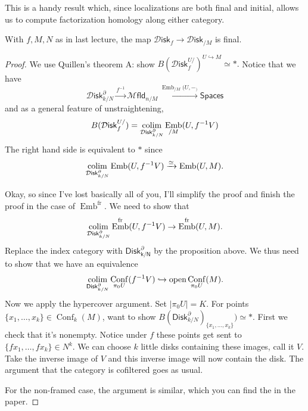 \documentclass{amsart}
\DeclareMathOperator{\Emb}{Emb}
\DeclareMathOperator{\Conf}{Conf}
\begin{document}
This is a handy result which, since localizations are both final and initial,
allows us to compute factorization homology along either category.
\begin{lemma}[AF 3.1]
    With $f,M,N$ as in last lecture, the map $\mathcal{D}\mathsf{isk}_f\to\mathcal{D}\mathsf{isk}_{/M}$ is final.
\end{lemma}
\begin{proof}
    We use Quillen's theorem A: show $B(\mathcal{D}\mathsf{isk}_f^{U/})^{U\hookrightarrow M}\simeq *.$
    Notice that we have
    \begin{equation*}
        \mathcal{D}\mathsf{isk}_{k/N}^\partial \xrightarrow{f^{-1}} \mathcal{M}\mathsf{fld}_{n/M} \xrightarrow{\Emb_{/M}(U,-_)} \mathsf{Spaces}
    \end{equation*}
    and as a general feature of unstraightening,
    \begin{equation*}
        B(\mathcal{D}\mathsf{isk}_f^{U/}) = \colim_{\mathcal{D}\mathsf{isk}_{k/N}^\partial} \Emb_{/M}(U, f^{-1}V)
    \end{equation*}
    The right hand side is equivalent to $*$ since
    \begin{equation*}
        \colim_{\mathcal{D}\mathsf{isk}_{k/N}^\partial} \Emb(U, f^{-1}V) \xrightarrow{\simeq} \Emb(U,M).
    \end{equation*}

    Okay, so since I've lost basically all of you, I'll simplify the proof and finish the proof in the case of $\Emb^\text{fr}$.
    We need to show that
    \begin{equation*}
        \colim_{\mathcal{D}\mathsf{isk}_{k/N}^\partial} \Emb^\text{fr}(U, f^{-1}V)\to \Emb^\text{fr}(U,M).
    \end{equation*}
    Replace the index category with $\mathsf{Disk_{k/N}^\partial}$ by the proposition above. We thus need
    to show that we have an equivalence
    \begin{equation*}
        \colim_{\mathsf{Disk}_{k/N}^\partial} \Conf_{\pi_0U}(f^{-1}V)\hookrightarrow{\text{open}} \Conf_{\pi_0U}(M).
    \end{equation*}
    Now we apply the hypercover argument. Set $|\pi_0U|=K$. For points $\{x_1,\ldots,x_k\}\in\Conf_k(M)$,
    want to show $B(\mathsf{Disk}_{k/N}^\partial)_{\{x_1,\ldots,x_k\}})\simeq*$. First we check that it's
    nonempty. Notice under $f$ these points get sent to $\{fx_1,\ldots,fx_k\}\in N^k$. We can choose $k$
    little disks containing these images, call it $V$. Take the inverse image of $V$ and this inverse image
    will now contain the disk. The argument that the category is cofiltered goes as usual.

    For the non-framed case, the argument is similar, which you can find the in the paper.
\end{proof}
\end{document}
